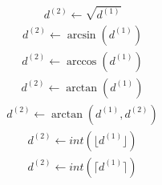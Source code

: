 \documentclass[a4paper,fleqn]{ltjsarticle}
\begin{document}
  \begin{align}
  d^{(2)} \leftarrow \sqrt{d^{(1)}}
  \end{align}
  \begin{align}
  d^{(2)} \leftarrow \arcsin\left(d^{(1)}\right)
  \end{align}
  \begin{align}
  d^{(2)} \leftarrow \arccos\left(d^{(1)}\right)
  \end{align}
  \begin{align}
  d^{(2)} \leftarrow \arctan\left(d^{(1)}\right)
  \end{align}
  \begin{align}
  d^{(2)} \leftarrow \arctan\left(d^{(1)},d^{(2)}\right)
  \end{align}
  \begin{align}
  d^{(2)} \leftarrow int\left(\lfloor d^{(1)}\rfloor\right)
  \end{align}
  \begin{align}
  d^{(2)} \leftarrow int\left(\lceil d^{(1)}\rceil\right)
  \end{align}
\end{document}
